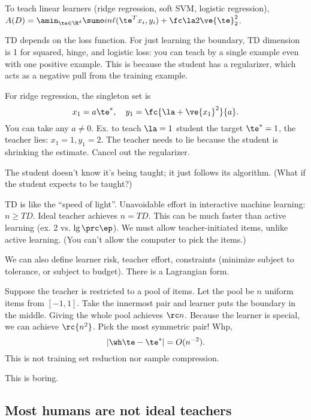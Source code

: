 To teach linear learners (ridge regression, soft SVM, logistic regression), $A(D) = \amin_{\te\in \R^d} \sumo in \ell(\te^Tx_i,y_i) + \fc\la2\ve{\te}_2^2$.

TD depends on the loss function.
For just learning the boundary, TD dimension is 1 for squared, hinge, and logistic loss: you can teach by a single example even with one positive example. This is because the student has a regularizer, which acts as a negative pull from the training example.

For ridge regression, the singleton set is
$$
x_1 = a\te^*, \quad y_1 = \fc{\la + \ve{x_1}^2}{a}.
$$
You can take any $a\ne 0$. 
Ex. to teach $\la=1$ student the target $\te^*=1$, the teacher lies: $x_1=1,y_1=2$. 
The teacher needs to lie because the student is shrinking the estimate. Cancel out the regularizer.

The student doesn't know it's being taught; it just follows its algorithm.
(What if the student expects to be taught?)

TD is like the ``speed of light''.
Unavoidable effort in interactive machine learning: $n\ge TD$. 
Ideal teacher achieves $n=TD$. This can be much faster than active learning (ex. 2 vs. $\lg\prc\ep$). We must allow teacher-initiated items, unlike active learning. (You can't allow the computer to pick the items.)

We can also define learner risk, teacher effort, constraints (minimize subject to tolerance, or subject to budget). There is a Lagrangian form.

Suppose the teacher is restricted to a pool of items. Let the pool be $n$ uniform items from $[-1,1]$.
Take the innermost pair and learner puts the boundary in the middle.
Giving the whole pool achieves $\rc n$. Because the learner is special, we can achieve $\rc{n^2}$. Pick the most symmetric pair! Whp,
$$
|\wh \te - \te^*| =O(n^{-2}).
$$
This is not training set reduction nor sample compression.


This is boring.

\subsection{Most humans are not ideal teachers}

